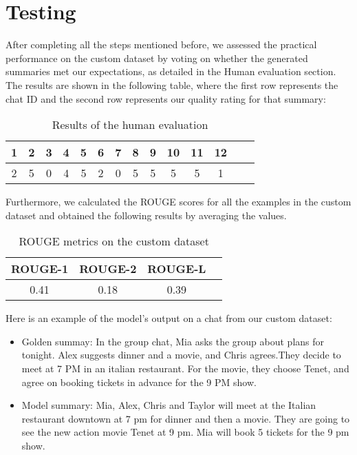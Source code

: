 \documentclass[10pt,twocolumn,letterpaper]{article}
\begin{document}
\section{Testing}
After completing all the steps mentioned before, we assessed the practical performance on the custom dataset by voting on whether the generated summaries met our expectations, as detailed in the Human evaluation section. The results are shown in the following table, where the first row represents the chat ID and the second row represents our quality rating for that summary:
\FloatBarrier
\begin{table}[h!]
    \centering
    \begin{tabular}{|c|c|c|c|c|c|c|c|c|c|c|c|c|c|}
        \hline
        \rowcolor{lightergray}
        1 & 2 & 3 & 4 & 5 & 6 & 7 & 8 & 9 & 10 & 11 & 12 \\ 
        \hline
        2 & 5 & 0 & 4 & 5 & 2 & 0 & 5 & 5 & 5 & 5 & 1\\
        \hline
    \end{tabular}
\caption{Results of the human evaluation}
\label{table:humanEval}
\end{table} 
\FloatBarrier \noindent
Furthermore, we calculated the ROUGE scores for all the examples in the custom dataset and obtained the following results by averaging the values.
\FloatBarrier
\begin{table}[h!]
    \centering
    \begin{tabular}{|c|c|c|c|}
        \hline
        \rowcolor{lightergray}
        ROUGE-1 & ROUGE-2 & ROUGE-L \\ 
        \hline
        0.41 & 0.18 & 0.39  \\
        \hline
    \end{tabular}
\caption{ROUGE metrics on the custom dataset}
\label{table:ROUGEcustom}
\end{table} 
\FloatBarrier \noindent
Here is an example of the model’s output on a chat from our custom dataset:
\begin{itemize}
    \item Golden summay: In the group chat, Mia asks the group about plans for tonight. Alex suggests
    dinner and a movie, and Chris agrees.They decide to meet at 7 PM in an
    italian restaurant. For the movie, they choose Tenet, and agree on booking
    tickets in advance for the 9 PM show.
    \item Model summary: Mia, Alex, Chris and Taylor will meet at the Italian restaurant downtown at 7 pm for dinner and then a movie. They are going to see the new action movie Tenet at 9 pm. Mia will book 5 tickets for the 9 pm show.
\end{itemize}
\end{document}
